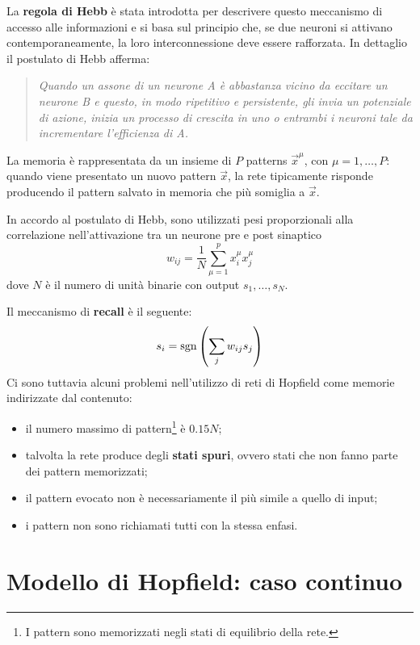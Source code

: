 La \textbf{regola di Hebb} è stata introdotta per descrivere questo meccanismo di accesso alle informazioni e si basa sul principio che, se due neuroni si attivano contemporaneamente, la loro interconnessione deve essere rafforzata. In dettaglio il postulato di Hebb afferma:
\begin{quote}
	\emph{Quando un assone di un neurone A è abbastanza vicino da eccitare un neurone B e questo, in modo ripetitivo e persistente, gli invia un potenziale di azione, inizia un processo di crescita in uno o entrambi i neuroni tale da incrementare l'efficienza di A.}
\end{quote}
La memoria è rappresentata da un insieme di $P$ patterns $\vec{x}^\mu$, con $\mu = 1, \dots, P$: quando viene presentato un nuovo pattern $\vec{x}$, la rete tipicamente risponde producendo il pattern salvato in memoria che più somiglia a $\vec{x}$.

In accordo al postulato di Hebb, sono utilizzati pesi proporzionali alla correlazione nell'attivazione tra un neurone pre e post sinaptico
\begin{displaymath}
	w_{ij} = \frac{1}{N} \sum_{\mu = 1}^p x_i^\mu x_j^\mu
\end{displaymath}
dove $N$ è il numero di unità binarie con output $s_1, \dots, s_N$.

Il meccanismo di \textbf{recall} è il seguente:
\begin{displaymath}
	s_i = \operatorname*{sgn}\left(\sum_j w_{ij} s_j \right)
\end{displaymath}
Ci sono tuttavia alcuni problemi nell'utilizzo di reti di Hopfield come memorie indirizzate dal contenuto:
\begin{itemize}
	\item il numero massimo di pattern\footnote{I pattern sono memorizzati negli stati di equilibrio della rete.} è $0.15 N$;
	\item talvolta la rete produce degli \textbf{stati spuri}, ovvero stati che non fanno parte dei pattern memorizzati;
	\item il pattern evocato non è necessariamente il più simile a quello di input;
	\item i pattern non sono richiamati tutti con la stessa enfasi.
\end{itemize}

\section{Modello di Hopfield: caso continuo}
\label{sec:modello_di_hopfield_caso_continuo}

